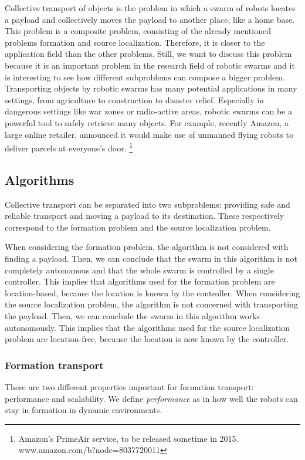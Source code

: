 
Collective transport of objects is the problem in which a swarm of robots locates a payload and collectively moves the payload to another place, like a home base.
This problem is a composite problem, consisting of the already mentioned problems formation and source localization.
Therefore, it is closer to the application field than the other problems.
Still, we want to discuss this problem because it is an important problem in the research field of robotic swarms and it is interesting to see how different subproblems can compose a bigger problem.
Transporting objects by robotic swarms has many potential applications in many settings, from agriculture to construction to disaster relief.
Especially in dangerous settings like war zones or radio-active areas, robotic swarms can be a powerful tool to safely retrieve many objects.
For example, recently Amazon, a large online retailer, announced it would make use of unmanned flying robots to deliver parcels at everyone's door. \footnote{Amazon's PrimeAir service, to be released sometime in 2015. www.amazon.com/b?node=8037720011}

\subsection{Algorithms}

Collective transport can be separated into two subproblems: providing safe and reliable transport and moving a payload to its destination.
These respectively correspond to the formation problem and the source localization problem.

When considering the formation problem, the algorithm is not considered with finding a payload. 
Then, we can conclude that the swarm in this algorithm is not completely autonomous and that the whole swarm is controlled by a single controller.
This implies that algorithms used for the formation problem are location-based, because the location is known by the controller. \cite{Michael2011cooperative,mas2012object}
When considering the source localization problem, the algorithm is not concerned with transporting the payload.
Then, we can conclude the swarm in this algorithm works autonomously. 
This implies that the algorithms used for the source localization problem are location-free, because the location is now known by the controller. \cite{Rubenstein2013collecive, sugawara2012object}

\subsubsection{Formation transport}
There are two different properties important for formation transport: performance and scalability.
We define \emph{performance} as in how well the robots can stay in formation in dynamic environments. \\


